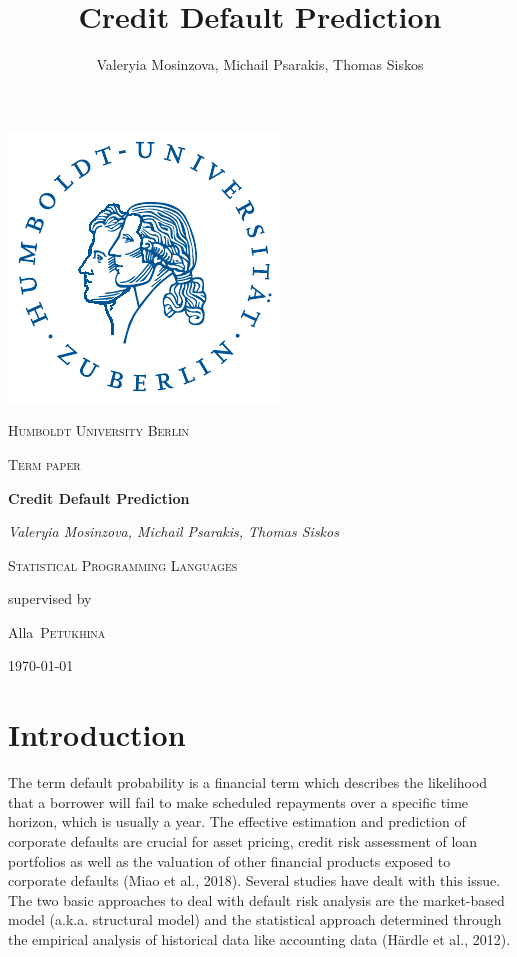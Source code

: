 \documentclass{article}
\title{Credit Default Prediction}
\author{Valeryia Mosinzova, Michail Psarakis, Thomas Siskos}
\date{ }
\begin{document}
\begin{titlepage}
  \begin{center}
  
  \includegraphics[scale=1.25]{hulogo.pdf} \par\vspace{1cm}
  {\scshape\LARGE Humboldt University Berlin \par}
  \vspace{1cm}
  {\scshape\Large Term paper\par}
  \vspace{1.5cm}
  {\huge\bfseries Credit Default Prediction\par}
  \vspace{1cm}
  {\Large\itshape Valeryia Mosinzova, Michail Psarakis, Thomas Siskos \par}
  \vspace{1cm}
  {\Large\scshape Statistical Programming Languages\par}
  \vspace{1cm}
  \vfill
  supervised by \par
  {\Large Alla~\scshape Petukhina \par}
  \vfill
  {\large \today\par}
  \end{center}
\end{titlepage}

\tableofcontents
\newpage

\section{Introduction}

The term default probability is a financial term which describes the likelihood that a borrower will fail to make scheduled repayments over a specific time horizon, which is usually a year. The effective estimation and prediction of corporate defaults are crucial for asset pricing, credit risk assessment of loan portfolios as well as the valuation of other financial products exposed to corporate defaults (Miao et al., 2018). Several studies have dealt with this issue. The two basic approaches to deal with default risk analysis are the market-based model (a.k.a. structural model) and the statistical approach determined through the empirical analysis of historical data like accounting data (H{\"a}rdle et al., 2012).
\end{document}
